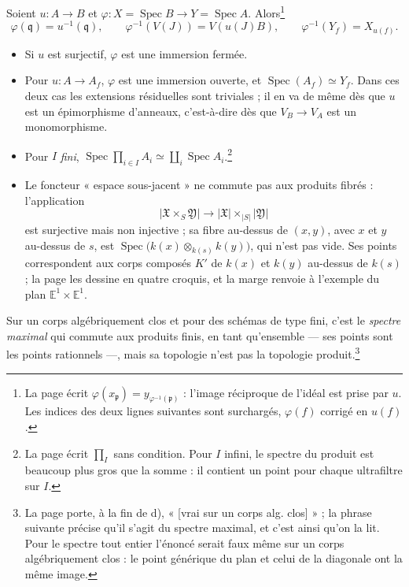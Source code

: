 \documentclass[11pt,a4paper]{article}
\begin{document}
Soient $u : A \to B$ et $\varphi : X = \operatorname{Spec} B \to Y = \operatorname{Spec} A$.
Alors\footnote{La page écrit $\varphi(x_{\mathfrak{p}}) = y_{\varphi^{-1}(\mathfrak{p})}$ :
l'image réciproque de l'idéal est prise par $u$. Les indices des deux lignes
suivantes sont surchargés, $\varphi(f)$ corrigé en $u(f)$.}
\[
\varphi(\mathfrak{q}) = u^{-1}(\mathfrak{q}), \qquad
\varphi^{-1}(V(J)) = V(u(J)B), \qquad
\varphi^{-1}(Y_f) = X_{u(f)} .
\]

\begin{itemize}
  \item[a)] Si $u$ est surjectif, $\varphi$ est une immersion fermée.
  \item[b)] Pour $u : A \to A_f$, $\varphi$ est une immersion ouverte, et
  $\operatorname{Spec}(A_f) \simeq Y_f$. Dans ces deux cas les extensions
  résiduelles sont triviales ; il en va de même dès que $u$ est un épimorphisme
  d'anneaux, c'est-à-dire dès que $V_B \to V_A$ est un monomorphisme.
  \item[c)] Pour $I$ \emph{fini},
  $\operatorname{Spec} \prod_{i \in I} A_i \simeq \coprod_i \operatorname{Spec} A_i$.\footnote{La
  page écrit $\prod_I$ sans condition. Pour $I$ infini, le spectre du produit est
  beaucoup plus gros que la somme : il contient un point pour chaque
  ultrafiltre sur $I$.}
  \item[d)] Le foncteur « espace sous-jacent » ne commute pas aux produits
  fibrés : l'application
  \[
  \lvert \mathfrak{X} \times_S \mathfrak{Y} \rvert \longrightarrow
  \lvert \mathfrak{X} \rvert \times_{\lvert S \rvert} \lvert \mathfrak{Y} \rvert
  \]
  est surjective mais non injective ; sa fibre au-dessus de $(x, y)$, avec $x$ et
  $y$ au-dessus de $s$, est $\operatorname{Spec}\bigl(k(x) \otimes_{k(s)} k(y)\bigr)$,
  qui n'est pas vide. Ses points correspondent aux corps composés $K'$ de $k(x)$
  et $k(y)$ au-dessus de $k(s)$ ; la page les dessine en quatre croquis, et la
  marge renvoie à l'exemple du plan $\mathbb{E}^1 \times \mathbb{E}^1$.
\end{itemize}

Sur un corps algébriquement clos et pour des schémas de type fini, c'est le
\emph{spectre maximal} qui commute aux produits finis, en tant qu'ensemble ---
ses points sont les points rationnels ---, mais sa topologie n'est pas la
topologie produit.\footnote{La page porte, à la fin de d), « [vrai sur un corps
alg. clos] » ; la phrase suivante précise qu'il s'agit du spectre maximal, et
c'est ainsi qu'on la lit. Pour le spectre tout entier l'énoncé serait faux même
sur un corps algébriquement clos : le point générique du plan et celui de la
diagonale ont la même image.}
\end{document}
